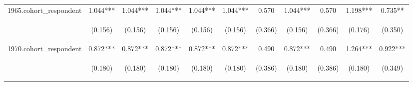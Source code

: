 \begin{center}
\begin{tabular}{lcccccccccc}
1965.cohort\_respondent & 1.044*** & 1.044*** & 1.044*** & 1.044*** & 1.044*** & 0.570 & 1.044*** & 0.570 & 1.198*** & 0.735** \\
\vspace{4pt} & \begin{footnotesize}(0.156)\end{footnotesize} & \begin{footnotesize}(0.156)\end{footnotesize} & \begin{footnotesize}(0.156)\end{footnotesize} & \begin{footnotesize}(0.156)\end{footnotesize} & \begin{footnotesize}(0.156)\end{footnotesize} & \begin{footnotesize}(0.366)\end{footnotesize} & \begin{footnotesize}(0.156)\end{footnotesize} & \begin{footnotesize}(0.366)\end{footnotesize} & \begin{footnotesize}(0.176)\end{footnotesize} & \begin{footnotesize}(0.350)\end{footnotesize} \\
1970.cohort\_respondent & 0.872*** & 0.872*** & 0.872*** & 0.872*** & 0.872*** & 0.490 & 0.872*** & 0.490 & 1.264*** & 0.922*** \\
\vspace{4pt} & \begin{footnotesize}(0.180)\end{footnotesize} & \begin{footnotesize}(0.180)\end{footnotesize} & \begin{footnotesize}(0.180)\end{footnotesize} & \begin{footnotesize}(0.180)\end{footnotesize} & \begin{footnotesize}(0.180)\end{footnotesize} & \begin{footnotesize}(0.386)\end{footnotesize} & \begin{footnotesize}(0.180)\end{footnotesize} & \begin{footnotesize}(0.386)\end{footnotesize} & \begin{footnotesize}(0.180)\end{footnotesize} & \begin{footnotesize}(0.349)\end{footnotesize} \\

\end{tabular}
\end{center}
